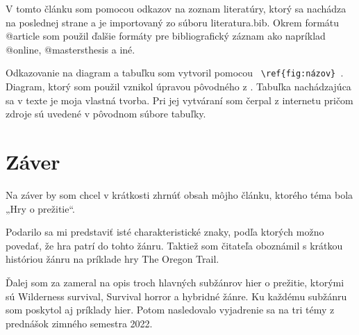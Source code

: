 \documentclass[10pt,oneoside,slovak,a4paper]{article}
\begin{document}
V tomto článku som pomocou odkazov na zoznam literatúry, ktorý sa nachádza na poslednej strane a je importovaný zo súboru literatura.bib. 
Okrem formátu @article  som použil ďalšie formáty pre bibliografický záznam ako napríklad @online, @mastersthesis a iné. 

Odkazovanie na  diagram a tabuľku som vytvoril pomocou  \verb= \ref{fig:názov} =. Diagram, ktorý som použil vznikol úpravou pôvodného z \cite{Reid}. Tabuľka nachádzajúca sa v texte je moja vlastná tvorba. Pri jej vytváraní som čerpal z internetu pričom zdroje sú uvedené v pôvodnom súbore tabuľky.

\newpage

\section{Záver} \label{zaver} %

Na záver by som chcel v krátkosti zhrnúť obsah môjho článku, ktorého téma bola „Hry o prežitie“.  

Podarilo sa mi predstaviť isté charakteristické znaky, podľa ktorých možno povedať, že hra patrí do tohto žánru. Taktiež som čitateľa oboznámil s krátkou históriou žánru na príklade hry  The Oregon Trail. 

Ďalej som za zameral na opis troch hlavných subžánrov hier o prežitie, ktorými sú Wilderness survival, Survival horror a hybridné žánre. Ku každému subžánru som poskytol aj príklady hier.
Potom nasledovalo vyjadrenie sa na tri témy z prednášok zimného semestra 2022.




\newpage

\end{document}
